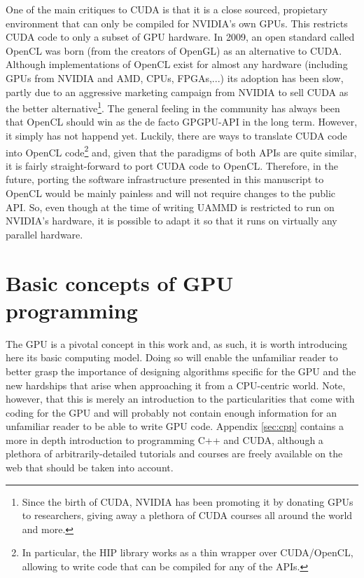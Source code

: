 \documentclass[ twoside,openright,titlepage,numbers=noenddot,%
headinclude,footinclude,cleardoublepage=empty,abstract=on,
BCOR=5mm,paper=a4,fontsize=11pt, dvipsnames
]{scrreprt}
\newcommand{\uammd}{\gls{UAMMD}\xspace}
\newcommand{\gpu}{\gls{GPU}\xspace}
\begin{document}
One of the main critiques to CUDA is that it is a close sourced, propietary environment that can only be compiled for NVIDIA's own \glspl{GPU}. This restricts CUDA code to only a subset of \gpu hardware.
In 2009, an open standard called OpenCL\cite{Stone2010} was born (from the creators of OpenGL) as an alternative to CUDA. Although implementations of OpenCL exist for almost any hardware (including GPUs from NVIDIA and AMD, CPUs, FPGAs,...) its adoption has been slow, partly due to an aggressive marketing campaign from NVIDIA to sell CUDA as the better alternative\footnote{Since the birth of CUDA, NVIDIA has been promoting it by donating GPUs to researchers, giving away a plethora of CUDA courses all around the world and more.}. The general feeling in the community has always been that OpenCL should win as the de facto \gls{GPGPU}-\gls{API} in the long term. However, it simply has not happend yet.
Luckily, there are ways to translate CUDA code into OpenCL code\footnote{In particular, the HIP library works as a thin wrapper over CUDA/OpenCL, allowing to write code that can be compiled for any of the \glspl{API}.} and, given that the paradigms of both \glspl{API} are quite similar, it is fairly straight-forward to port CUDA code to OpenCL. Therefore, in the future, porting the software infrastructure presented in this manuscript to OpenCL would be mainly painless and will not require changes to the public \gls{API}. So, even though at the time of writing \uammd is restricted to run on NVIDIA's hardware, it is possible to adapt it so that it runs on virtually any parallel hardware.

\section{Basic concepts of GPU programming}\label{ch:gpuintroduction}
The \gpu is a pivotal concept in this work and, as such, it is worth introducing here its basic computing model. Doing so will enable the unfamiliar reader to better grasp the importance of designing algorithms specific for the \gpu and the new hardships that arise when approaching it from a CPU-centric world. Note, however, that this is merely an introduction to the particularities that come with coding for the \gpu and will probably not contain enough information for an unfamiliar reader to be able to write \gpu code. Appendix \ref{sec:cpp} contains a more in depth introduction to programming C++ and CUDA, although a plethora of arbitrarily-detailed tutorials and courses are freely available on the web that should be taken into account.
\end{document}
